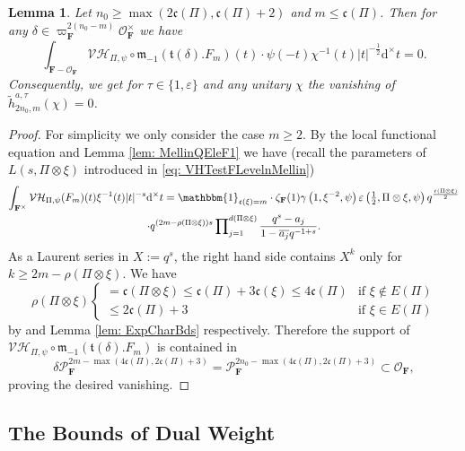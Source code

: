 \documentclass[A4]{amsart}
\def\leq{\leqslant}
\def\geq{\geqslant}
\newtheorem{lemma}      [theorem]{Lemma}
\numberwithin{equation}{section} \everymath{\displaystyle}
\newcommand{\id}{\mathbbm{1}}
\newcommand{\ud}{\mathrm{d}}
\newcommand{\F}{\mathbf{F}}
\newcommand{\vO}{\mathcal{O}}
\newcommand{\vP}{\mathcal{P}}
\newcommand{\norm}[1][\cdot]{\lvert #1 \rvert}
\newcommand{\Mult}{\mathfrak{m}}
\newcommand{\VorH}{\mathcal{VH}}
\newcommand{\Trans}{\mathfrak{t}}
\newcommand{\cond}{\mathfrak{c}}
\newcommand{\condL}{\mathfrak{\rho}}
\begin{document}
\begin{lemma} \label{lem: e1DWt-FineBd4}
	Let $n_0 \geq \max(2\cond(\Pi), \cond(\Pi)+2)$ and $m \leq \cond(\Pi)$. Then for any $\delta \in \varpi_{\F}^{2(n_0-m)}\vO_{\F}^{\times}$ we have
	$$ \int_{\F-\vO_{\F}} \VorH_{\Pi,\psi} \circ \Mult_{-1} \left( \Trans(\delta).F_m \right)(t) \cdot \psi(-t)\chi^{-1}(t)\norm[t]^{-\frac{1}{2}} \ud^{\times} t = 0. $$
	Consequently, we get for $\tau \in \{ 1,\varepsilon \}$ and any unitary $\chi$ the vanishing of $\widetilde{h}_{2n_0,m}^{a,\tau}(\chi) = 0$.
\end{lemma}
\begin{proof}
	For simplicity we only consider the case $m \geq 2$. By the local functional equation and Lemma \ref{lem: MellinQEleF1} we have (recall the parameters of $L(s,\Pi \otimes \xi)$ introduced in \eqref{eq: VHTestFLevelnMellin})
\begin{multline*} 
	\int_{\F^{\times}} \VorH_{\Pi,\psi}(F_m)(t) \xi^{-1}(t) \norm[t]^{-s} \ud^{\times} t = \id_{\cond(\xi)=m} \cdot \zeta_{\F}(1) \gamma \left( 1, \xi^{-2}, \psi \right) \varepsilon \left( \tfrac{1}{2}, \Pi \otimes \xi, \psi \right) q^{\frac{\cond(\Pi \otimes \xi)}{2}} \\
	\cdot q^{(2m-\condL(\Pi \otimes \xi))s} \sideset{}{_{j=1}^{d(\Pi \otimes \xi)}} \prod \frac{q^s-a_j}{1-\overline{a_j}q^{-1+s}}.
\end{multline*}
	As a Laurent series in $X:=q^s$, the right hand side contains $X^k$ only for $k \geq 2m-\condL(\Pi \otimes \xi)$. We have
	$$ \condL(\Pi \otimes \xi) \begin{cases}
		= \cond(\Pi \otimes \xi) \leq \cond(\Pi)+3\cond(\xi) \leq 4\cond(\Pi) & \text{if } \xi \notin E(\Pi) \\
		\leq 2\cond(\Pi)+3 & \text{if } \xi \in E(\Pi)
	\end{cases} $$
by \cite{BuH97} and Lemma \ref{lem: ExpCharBds} respectively. Therefore the support of $\VorH_{\Pi,\psi} \circ \Mult_{-1} \left( \Trans(\delta).F_m \right)$ is contained in
	$$ \delta \vP_{\F}^{2m-\max(4\cond(\Pi), 2\cond(\Pi)+3)} = \vP_{\F}^{2n_0-\max(4\cond(\Pi), 2\cond(\Pi)+3)} \subset \vO_{\F}, $$
proving the desired vanishing.
\end{proof}	

	
	\subsection{The Bounds of Dual Weight}
	
\end{document}
